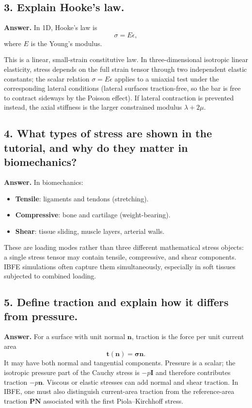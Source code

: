 \documentclass[12pt]{article}
\begin{document}
\subsection*{3. Explain Hooke’s law.}

\textbf{Answer.}
In 1D, Hooke’s law is
\[
\sigma = E \epsilon,
\]
where $E$ is the Young’s modulus.

This is a linear, small-strain constitutive law. In three-dimensional isotropic linear elasticity, stress depends on the full strain tensor through two independent elastic constants; the scalar relation $\sigma=E\epsilon$ applies to a uniaxial test under the corresponding lateral conditions (lateral surfaces traction-free, so the bar is free to contract sideways by the Poisson effect). If lateral contraction is prevented instead, the axial stiffness is the larger constrained modulus $\lambda+2\mu$.


\subsection*{4. What types of stress are shown in the tutorial, and why do they matter in biomechanics?}

\textbf{Answer.}
In biomechanics:
\begin{itemize}
    \item \textbf{Tensile}: ligaments and tendons (stretching).
    \item \textbf{Compressive}: bone and cartilage (weight-bearing).
    \item \textbf{Shear}: tissue sliding, muscle layers, arterial walls.
\end{itemize}
These are loading modes rather than three different mathematical stress objects: a single stress tensor may contain tensile, compressive, and shear components. IBFE simulations often capture them simultaneously, especially in soft tissues subjected to combined loading.


\subsection*{5. Define traction and explain how it differs from pressure.}

\textbf{Answer.}
For a surface with unit normal $\mathbf n$, traction is the force per unit current area
\[
\mathbf t(\mathbf n)=\boldsymbol\sigma\mathbf n.
\]
It may have both normal and tangential components. Pressure is a scalar; the isotropic pressure part of the Cauchy stress is $-p\mathbf I$ and therefore contributes traction $-p\mathbf n$. Viscous or elastic stresses can add normal and shear traction. In IBFE, one must also distinguish current-area traction from the reference-area traction $\mathbf P\mathbf N$ associated with the first Piola--Kirchhoff stress.
\end{document}
